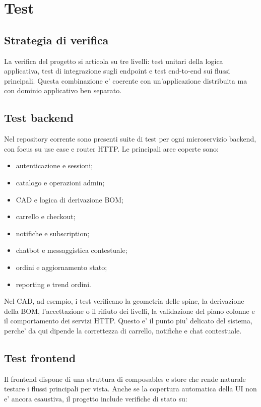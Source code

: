 \chapter{Test}

\section{Strategia di verifica}

La verifica del progetto si articola su tre livelli: test unitari della logica applicativa, test di integrazione sugli endpoint e test end-to-end sui flussi principali. Questa combinazione e' coerente con un'applicazione distribuita ma con dominio applicativo ben separato.

\section{Test backend}

Nel repository corrente sono presenti suite di test per ogni microservizio backend, con focus su use case e router HTTP. Le principali aree coperte sono:

\begin{itemize}
\item autenticazione e sessioni;
\item catalogo e operazioni admin;
\item CAD e logica di derivazione BOM;
\item carrello e checkout;
\item notifiche e subscription;
\item chatbot e messaggistica contestuale;
\item ordini e aggiornamento stato;
\item reporting e trend ordini.
\end{itemize}

Nel CAD, ad esempio, i test verificano la geometria delle spine, la derivazione della BOM, l'accettazione o il rifiuto dei livelli, la validazione del piano colonne e il comportamento dei servizi HTTP. Questo e' il punto piu' delicato del sistema, perche' da qui dipende la correttezza di carrello, notifiche e chat contestuale.

\section{Test frontend}

Il frontend dispone di una struttura di composables e store che rende naturale testare i flussi principali per vista. Anche se la copertura automatica della UI non e' ancora esaustiva, il progetto include verifiche di stato su:


